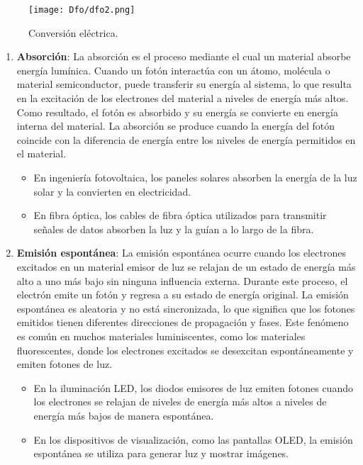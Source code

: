 \documentclass[12pt,fleqn,a4paper,oneside]{LegrandOrangeBook}
\begin{document}
\begin{figure}[H]
\centering
\texttt{[image: Dfo/dfo2.png]}
\caption{Conversión eléctrica.}
\end{figure}
\begin{enumerate}
\item \textbf{Absorción}: La absorción es el proceso mediante el cual un material absorbe energía lumínica. Cuando un fotón interactúa con un átomo, molécula o material semiconductor, puede transferir su energía al sistema, lo que resulta en la excitación de los electrones del material a niveles de energía más altos. Como resultado, el fotón es absorbido y su energía se convierte en energía interna del material. La absorción se produce cuando la energía del fotón coincide con la diferencia de energía entre los niveles de energía permitidos en el material.
\begin{itemize}
\item En ingeniería fotovoltaica, los paneles solares absorben la energía de la luz solar y la convierten en electricidad.
\item En fibra óptica, los cables de fibra óptica utilizados para transmitir señales de datos absorben la luz y la guían a lo largo de la fibra.
\end{itemize}
\item \textbf{Emisión espontánea}: La emisión espontánea ocurre cuando los electrones excitados en un material emisor de luz se relajan de un estado de energía más alto a uno más bajo sin ninguna influencia externa. Durante este proceso, el electrón emite un fotón y regresa a su estado de energía original. La emisión espontánea es aleatoria y no está sincronizada, lo que significa que los fotones emitidos tienen diferentes direcciones de propagación y fases. Este fenómeno es común en muchos materiales luminiscentes, como los materiales fluorescentes, donde los electrones excitados se desexcitan espontáneamente y emiten fotones de luz.
\begin{itemize}
\item En la iluminación LED, los diodos emisores de luz emiten fotones cuando los electrones se relajan de niveles de energía más altos a niveles de energía más bajos de manera espontánea.
\item En los dispositivos de visualización, como las pantallas OLED, la emisión espontánea se utiliza para generar luz y mostrar imágenes.
\end{itemize}

\end{enumerate}
\end{document}
